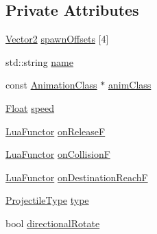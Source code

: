 \subsection*{Private Attributes}
\begin{DoxyCompactItemize}
\item 
\hyperlink{classZeta_1_1Vector2}{Vector2} \hyperlink{classZeta_1_1ProjectileClass_affd8ec969cb93a388e5e8542e3756f68}{spawn\+Offsets} \mbox{[}4\mbox{]}
\item 
std\+::string \hyperlink{classZeta_1_1ProjectileClass_a6eff7fe4769fa6286c2c763a97bd2da6}{name}
\item 
const \hyperlink{classZeta_1_1AnimationClass}{Animation\+Class} $\ast$ \hyperlink{classZeta_1_1ProjectileClass_a0c1826e924c0be03a17b8aeaf0f920e1}{anim\+Class}
\item 
\hyperlink{namespaceZeta_a1e0a1265f9b3bd3075fb0fabd39088ba}{Float} \hyperlink{classZeta_1_1ProjectileClass_ad93f9e1468a485598c1f0547bf7d9a70}{speed}
\item 
\hyperlink{classZeta_1_1LuaFunctor}{Lua\+Functor} \hyperlink{classZeta_1_1ProjectileClass_a61883efe5b8af3c8ac891a8e52c463ee}{on\+Release\+F}
\item 
\hyperlink{classZeta_1_1LuaFunctor}{Lua\+Functor} \hyperlink{classZeta_1_1ProjectileClass_a08f1625c591d5cb199dd7cfd110bfe6c}{on\+Collision\+F}
\item 
\hyperlink{classZeta_1_1LuaFunctor}{Lua\+Functor} \hyperlink{classZeta_1_1ProjectileClass_ab237dd1036988cc3a6c4cdb00bf9317e}{on\+Destination\+Reach\+F}
\item 
\hyperlink{classZeta_1_1ProjectileClass_ae4d46651595803ab0093180758ca94b0}{Projectile\+Type} \hyperlink{classZeta_1_1ProjectileClass_a381e3da4614d6af578994ab37f3c2019}{type}
\item 
bool \hyperlink{classZeta_1_1ProjectileClass_ac6336e57e6469d2fdf62960b00ac4ce7}{directional\+Rotate}
\end{DoxyCompactItemize}


